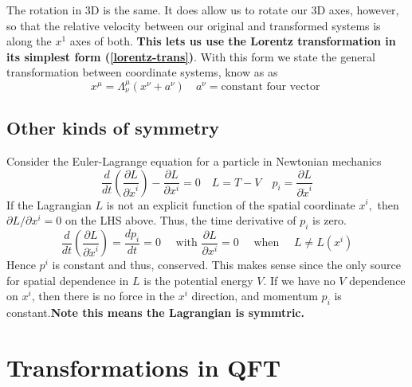 The rotation in 3D is the same. It does allow us to rotate our 3D axes, however, so that the relative velocity between our original and transformed systems is along the $x^1$ axes of both. \textbf{This lets us use the Lorentz transformation in its simplest form (\ref{lorentz-trans})}. With this form we state the general transformation between coordinate systems, know as  as
\begin{equation}
x^{\mu}=\Lambda_{\nu}^{\mu}\left(x^{\nu}+a^{\nu}\right) \quad a^{\nu}=\mathrm{constant} \text { four vector }
\label{poincare-trans}
\end{equation}

\subsection{Other kinds of symmetry}
Consider the Euler-Lagrange equation for a particle in Newtonian mechanics
$$
\frac{d}{d t}\left(\frac{\partial L}{\partial \dot{x}^{i}}\right)-\frac{\partial L}{\partial x^{i}}=0 \quad L=T-V \quad p_{i}=\frac{\partial L}{\partial \dot{x}^{i}}
$$
If the Lagrangian $L$ is not an explicit function of the spatial coordinate $x^i,$ then $\partial L / \partial x^{i}=0$ on the LHS above. Thus, the time derivative of $p_{i}$ is zero.
$$
\frac{d}{d t}\left(\frac{\partial L}{\partial \dot{x}^{i}}\right)=\frac{d p_{i}}{d t}=0 \quad \text { with } \frac{\partial L}{\partial x^{i}}=0 \quad \text { when } \quad L \neq L\left(x^{i}\right)
$$
Hence $p^i$ is constant and thus, conserved. This makes sense since the only source for spatial dependence in $L$ is the potential energy $V$. If we have no $V$ dependence on $x^i$, then there is no force in the $x^i$ direction, and momentum $p_i$ is constant.\textbf{Note this means the Lagrangian is symmtric.}


\section{Transformations in QFT}
